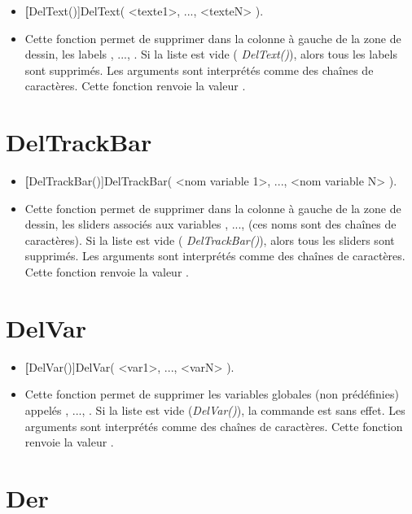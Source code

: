 \begin{itemize}
 \item \util \textbf[DelText()]{DelText( <texte1>, ..., <texteN> )}.
 \item \desc Cette fonction permet de supprimer dans la colonne à gauche de la zone de dessin, les labels , ..., . Si la liste est vide (\textsl{ DelText()}), alors tous les labels sont supprimés. Les arguments sont interprétés comme des chaînes de caractères. Cette fonction renvoie la valeur \Nil.
\end{itemize}

\section{DelTrackBar}\label{cmdDelTrackBar}

\begin{itemize}
 \item \util \textbf[DelTrackBar()]{DelTrackBar( <nom variable 1>, ..., <nom variable N> )}.
 \item \desc Cette fonction permet de supprimer dans la colonne à gauche de la zone de dessin, les sliders associés aux variables , ...,  (ces noms sont des chaînes de caractères). Si la liste est vide (\textsl{ DelTrackBar()}), alors tous les sliders sont supprimés. Les arguments sont interprétés comme des chaînes de caractères. Cette fonction renvoie la valeur \Nil.
\end{itemize}


\section{DelVar}\label{cmdDelVar}

\begin{itemize}
 \item \util \textbf[DelVar()]{DelVar( <var1>, ..., <varN> )}.
 \item \desc Cette fonction permet de supprimer les variables globales (non prédéfinies) appelés , ..., . Si la liste est vide (\textsl{DelVar()}), la commande est sans effet. Les arguments sont interprétés comme des chaînes de caractères. Cette fonction renvoie la valeur \Nil.
\end{itemize}


\section{Der}\label{cmdDer}

